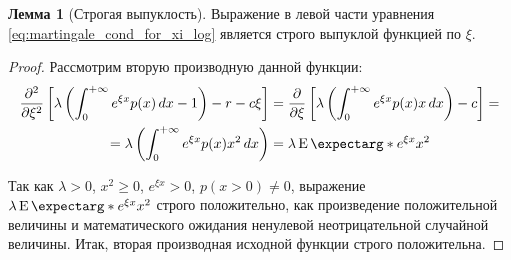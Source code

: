 \documentclass[a4paper,12pt]{article}
\theoremstyle{definition}
\newtheorem{lemma}{Лемма}
\newcommand{\expect}{\operatorname{E}\expectarg}
\begin{document}
\begin{lemma}[Строгая выпуклость]\label{thm:strict_convexity_m1}
Выражение в левой части уравнения \eqref{eq:martingale_cond_for_xi_log} является строго выпуклой функцией по $\xi$.
\end{lemma}
\begin{proof}
Рассмотрим вторую производную данной функции:
\begin{equation*}
\begin{split}
     \pdv[2]{}{\xi} \left[\lambda \left(\int_{0}^{+\infty} e^{\xi x} p(x) \,dx - 1\right) - r - c\xi \right] &= \pdv{}{\xi} \left[\lambda \left(\int_{0}^{+\infty} e^{\xi x} p(x) x \,dx \right) - c \right] =\\
     = \lambda \left(\int_{0}^{+\infty} e^{\xi x} p(x) x^{2} \,dx \right) &= \lambda \expect*{e^{\xi x} x^2}
\end{split}
\end{equation*}

Так как $\lambda > 0$, $x^2 \ge 0$, $e^{\xi x} > 0$, $p(x > 0) \neq 0$, выражение $\lambda \expect*{e^{\xi x} x^2}$ строго положительно, как произведение положительной величины и математического ожидания ненулевой неотрицательной случайной величины. Итак, вторая производная исходной функции строго положительна.

\end{proof}
\end{document}
